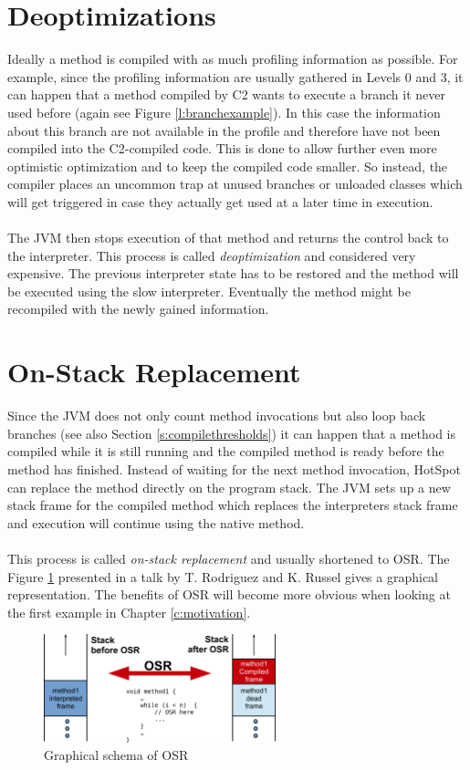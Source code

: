 \section{Deoptimizations}
\label{s:deoptimizations}
Ideally a method is compiled with as much profiling information as possible.
For example, since the profiling information are usually gathered in Levels 0 and 3, it can happen that a method compiled by C2 wants to execute a branch it never used before (again see Figure \ref{l:branchexample}).
In this case the information about this branch are not available in the profile and therefore have not been compiled into the C2-compiled code.
This is done to allow further even more optimistic optimization and to keep the compiled code smaller. So instead, the compiler places an uncommon trap at unused branches or unloaded classes which will get triggered in case they actually get used at a later time in execution.
\\\\
The JVM then stops execution of that method and returns the control back to the interpreter. This process is called \textit{deoptimization} and considered very expensive. The previous interpreter state has to be restored and the method will be executed using the slow interpreter. Eventually the method might be recompiled with the newly gained information.

\section{On-Stack Replacement}
\label{s:onstackreplacement}
Since the JVM does not only count method invocations but also loop back branches (see also Section \ref{s:compilethresholds}) it can happen that a method is compiled while it is still running and the compiled method is ready before the method has finished.
Instead of waiting for the next method invocation, HotSpot can replace the method directly on the program stack. The JVM sets up a new stack frame for the compiled method which replaces the interpreters stack frame and execution will continue using the native method.
\\\\
This process is called \textit{on-stack replacement} and usually shortened to OSR. The Figure \ref{f:osr} presented in a talk by T. Rodriguez and K. Russel \cite{client_compiler_talk} gives a graphical representation.
The benefits of OSR will become more obvious when looking at the first example in Chapter \ref{c:motivation}.
\begin{figure}[ht]
  \begin{center}
    \centering
    \includegraphics[width=0.6\textwidth]{figures/osr.png}
    \caption{Graphical schema of OSR}
    \label{f:osr}
  \end{center}
\end{figure}
